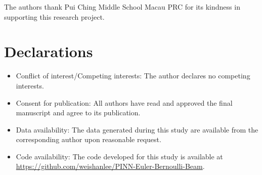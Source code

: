 \documentclass[pdflatex,sn-mathphys-num]{sn-jnl-modified}%
\theoremstyle{thmstyleone}%
\theoremstyle{thmstyletwo}%
\theoremstyle{thmstylethree}%
\begin{document}








\backmatter


The authors thank Pui Ching Middle School Macau PRC for its kindness in supporting this research project.

\section*{Declarations}

\begin{itemize}
\item Conflict of interest/Competing interests: The author declares no competing interests.
\item Consent for publication: All authors have read and approved the final manuscript and agree to its publication.
\item Data availability: The data generated during this study are available from the corresponding author upon reasonable request.
\item Code availability: The code developed for this study is available at \url{https://github.com/weishanlee/PINN-Euler-Bernoulli-Beam}.
\end{itemize}




%
\end{document}
